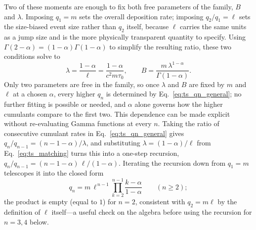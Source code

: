 \documentclass[preprint,12pt]{elsarticle}
\begin{document}
Two of these moments are enough to fix both free parameters of the family, $B$ and $\lambda$. Imposing $q_1=m$ sets the overall deposition rate; imposing $q_2/q_1=\ell$ sets the size-biased event size rather than $q_2$ itself, because $\ell$ carries the same units as a jump size and is the more physically transparent quantity to specify. Using $\Gamma(2-\alpha)=(1-\alpha)\Gamma(1-\alpha)$ to simplify the resulting ratio, these two conditions solve to
\begin{equation}
  \lambda=\frac{1-\alpha}{\ell}=\frac{1-\alpha}{c^2m\tau_0},
  \qquad
  B=\frac{m\,\lambda^{1-\alpha}}{\Gamma(1-\alpha)}.
  \label{eq:ts_matching}
\end{equation}
Only two parameters are free in the family, so once $\lambda$ and $B$ are
fixed by $m$ and $\ell$ at a chosen $\alpha$, every higher $q_n$ is
determined by Eq.~\eqref{eq:ts_qn_general}; no further fitting is possible or needed, and $\alpha$ alone governs how the higher cumulants compare to the first two. This dependence can be made explicit without re-evaluating Gamma functions at every $n$. Taking the ratio of
consecutive cumulant rates in Eq.~\eqref{eq:ts_qn_general} gives
$q_n/q_{n-1}=(n-1-\alpha)/\lambda$, and substituting $\lambda=(1-\alpha)/\ell$
from Eq.~\eqref{eq:ts_matching} turns this into a one-step recursion, $q_n/q_{n-1}=(n-1-\alpha)\,\ell/(1-\alpha)$. Iterating the recursion down from $q_1=m$
telescopes it into the closed form
\begin{equation}
  q_n=m\,\ell^{\,n-1}\prod_{k=2}^{n-1}\frac{k-\alpha}{1-\alpha}
  \qquad(n\ge2);
  \label{eq:ts_qn_product}
\end{equation}
the product is empty (equal to $1$) for $n=2$, consistent with $q_2=m\ell$
by the definition of $\ell$ itself---a useful check on the algebra before
using the recursion for $n=3,4$ below.
\end{document}
